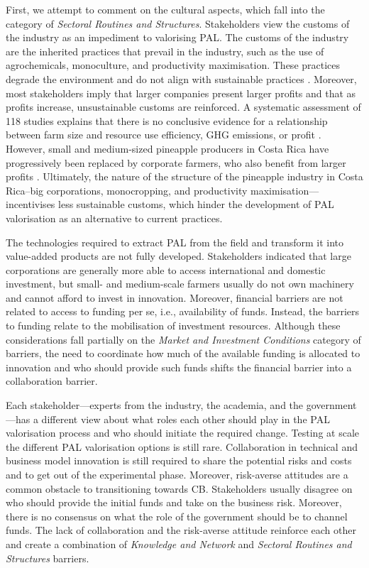 First, we attempt to comment on the cultural aspects, which fall into the category of \textit{Sectoral Routines and Structures}. Stakeholders view the customs of the industry as an impediment to valorising PAL. The customs of the industry are the inherited practices that prevail in the industry, such as the use of agrochemicals, monoculture, and productivity maximisation. These practices degrade the environment and do not align with sustainable practices \citep{magdoff2000hungry}. Moreover, most stakeholders imply that larger companies present larger profits and that as profits increase, unsustainable customs are reinforced. A systematic assessment of 118 studies explains that there is no conclusive evidence for a relationship between farm size and resource use efficiency, GHG emissions, or profit \citep{ricciardi2021higher}. However, small and medium-sized pineapple producers in Costa Rica have progressively been replaced by corporate farmers, who also benefit from larger profits \citep{rodriguez2020extractivismo}. Ultimately, the nature of the structure of the pineapple industry in Costa Rica--big corporations, monocropping, and productivity maximisation---incentivises less sustainable customs, which hinder the development of PAL valorisation as an alternative to current practices. 

The technologies required to extract PAL from the field and transform it into value-added products are not fully developed. Stakeholders indicated that large corporations are generally more able to access international and domestic investment, but small- and medium-scale farmers usually do not own machinery and cannot afford to invest in innovation. Moreover, financial barriers are not related to access to funding per se, i.e., availability of funds. Instead, the barriers to funding relate to the mobilisation of investment resources. Although these considerations fall partially on the \textit{Market and Investment Conditions} category of barriers, the need to coordinate how much of the available funding is allocated to innovation and who should provide such funds shifts the financial barrier into a collaboration barrier. 

Each stakeholder---experts from the industry, the academia, and the government---has a different view about what roles each other should play in the PAL valorisation process and who should initiate the required change. Testing at scale the different PAL valorisation options is still rare. Collaboration in technical and business model innovation is still required to share the potential risks and costs and to get out of the experimental phase. Moreover, risk-averse attitudes are a common obstacle to transitioning towards CB. Stakeholders usually disagree on who should provide the initial funds and take on the business risk. Moreover, there is no consensus on what the role of the government should be to channel funds. The lack of collaboration and the risk-averse attitude reinforce each other and create a combination of \textit{Knowledge and Network} and \textit{Sectoral Routines and Structures} barriers.

